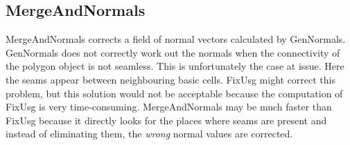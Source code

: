 \begin{htmlonly}



\startdocument
\subsection{MergeAndNormals}
\label{MergeAndNormals}


%
%

MergeAndNormals corrects a field of normal vectors
calculated by GenNormals. GenNormals does not correctly work out
the normals when the connectivity of the polygon object
is not seamless. This is unfortunately the case at issue.
Here the seams appear between neighbouring basic cells.
FixUsg might correct this problem, but this solution
would not be acceptable because the computation of FixUsg
is very time-consuming. MergeAndNormals may be much faster
than FixUsg because it directly looks for the places where seams
are present and instead of eliminating them, the {\sl wrong}
normal values are corrected.



\end{htmlonly}

